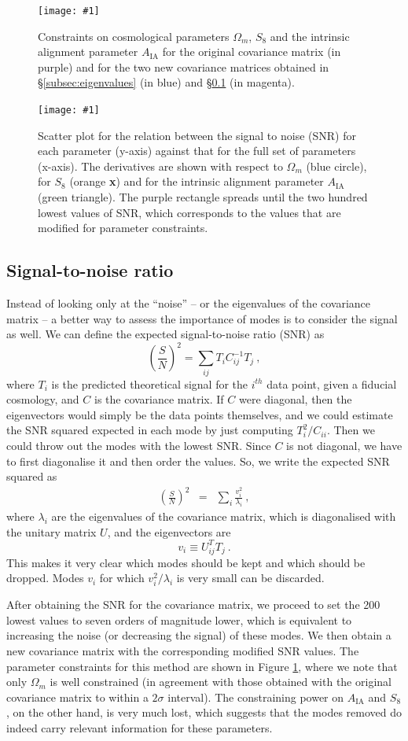 \documentclass[twocolumn]{\docclass}
\newcommand{\sfig}[2]{
	\texttt{[image: \#1]}
}
\newcommand{\Sfig}[2]{
	\begin{figure}[thbp]
		\sfig{../figures/#1.pdf}{\columnwidth}
		\caption{{\small #2}}
		\label{fig:#1}
	\end{figure}
}
\newcommand{\Svwide}[2]{
	\begin{figure}[thbp]
		\sfig{../figures/#1.pdf}{\textwidth}
		\caption{{\small #2}}
		\label{fig:#1}
	\end{figure}
}
\newcommand{\rf}[1]{Figure \ref{fig:#1}}
\newcommand{\rssec}[1]{\S\ref{subsec:#1}}
\newcommand\be{\begin{equation}}
\newcommand\ee{\end{equation}}
\def\bea{\begin{eqnarray}}
\def\eea{\end{eqnarray}}
\begin{document}
	\Sfig{EigSNR-constraints_wmS8A}{Constraints on cosmological parameters $\Omega_m$, $S_8$ and the intrinsic alignment parameter $A_{\mathrm{IA}}$ for the original covariance matrix (in purple) and for the two new covariance matrices obtained in \rssec{eigenvalues} (in blue) and \rssec{snr} (in magenta).}
	
	\Svwide{SNR_cuts200}{Scatter plot for the relation between the signal to noise (SNR)  for each parameter (y-axis) against that for the full set of parameters (x-axis). The derivatives are shown with respect to $\Omega_m$ (blue circle), for $S_8$ (orange \textbf{x}) and for the intrinsic alignment parameter $A_{\mathrm{IA}}$ (green triangle). The purple rectangle spreads until the two hundred lowest values of SNR, which corresponds to the values that are modified for parameter constraints.}
	
	\subsection{Signal-to-noise ratio}
	\label{subsec:snr}
	
	Instead of looking only at the ``noise'' -- or the eigenvalues of the covariance matrix -- a better way to assess the importance of modes is to consider the signal as well. We can define the expected signal-to-noise ratio (SNR) as
	\be
	\left(\frac{S}{N}\right)^2 = \sum_{ij} T_i C^{-1}_{ij} T_j\
	,\ee
	where $T_i$ is the predicted theoretical signal for the $i^{th}$ data point, given a fiducial cosmology, and $C$ is the covariance matrix. If $C$ were diagonal, then the eigenvectors would simply be the data points themselves, and we could estimate the SNR squared expected in each mode by just computing $T_i^2/C_{ii}$. Then we could throw out the modes with the lowest SNR. Since $C$ is not diagonal, we have to first diagonalise it and then order the values. So, we write the expected SNR squared as
	\bea
	\left(\frac{S}{N}\right)^2 %
	&=& \sum_{i} \frac{v_i^2}{\lambda_i}\
	,\eea
	where $\lambda_i$ are the eigenvalues of the covariance matrix, which is diagonalised with the unitary matrix $U$, and the eigenvectors are 
	\be
	v_i\equiv U_{ij}^T T_j\
	.\ee
	This makes it very clear which modes should be kept and which should be dropped. Modes $v_i$ for which $v_i^2/\lambda_i$ is very small can be discarded. 
	
	After obtaining the SNR for the covariance matrix, we proceed to set the 200 lowest values to seven orders of magnitude lower, which is equivalent to increasing the noise (or decreasing the signal) of these modes. We then obtain a new covariance matrix with the corresponding modified SNR values. 
	The parameter constraints for this method are shown in \rf{EigSNR-constraints_wmS8A}, where we note that only $\Omega_m$ is well constrained (in agreement with those obtained with the original covariance matrix to within a $2\sigma$ interval). The constraining power on $A_{\mathrm{IA}}$ and $S_8$, on the other hand, is very much lost, which suggests that the modes removed do indeed carry relevant information for these parameters.
	
\end{document}

